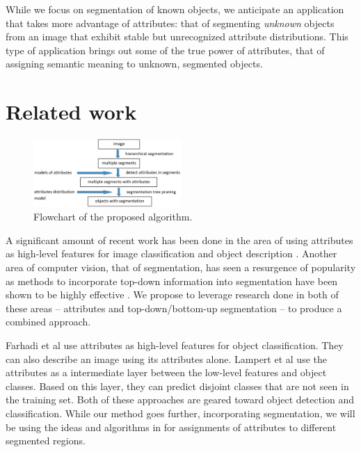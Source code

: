 \documentclass[10pt,twocolumn,letterpaper]{article}
\begin{document}
While we focus on segmentation of known objects, we anticipate an application
that takes more advantage of attributes: that of segmenting \emph{unknown}
objects from an image that exhibit stable but unrecognized attribute
distributions.  This type of application brings out some of the true power of
attributes, that of assigning semantic meaning to unknown, segmented objects.


\section{Related work}
\label{sec:related_work}

\begin{figure}
\centering
\includegraphics[width=0.5\textwidth]{figures/flowchart.eps}
\caption{Flowchart of the proposed algorithm.} \label{fig:flowchart}
\end{figure}

A significant amount of recent work has been done in the area of using
attributes as high-level features for image classification and object
description \cite{farhadi09, lampert09, kumar09}.
Another area of computer vision, that of segmentation,
has seen a resurgence of popularity as methods to incorporate top-down
information into segmentation have been shown to be highly effective
\cite{borenstein04, pantofaru, gu09, russell06, malisiewicz, leibe04, hoiem05, shotton06}.
We propose to leverage research done in both of these areas -- attributes
and top-down/bottom-up segmentation -- to produce a combined approach.

Farhadi et al
\cite{farhadi09} use attributes as high-level features for object classification. They
can also describe an image using its attributes alone.
Lampert et al \cite{lampert09}
use the attributes as a intermediate layer between the low-level
features and object classes. Based on this layer, they can predict
disjoint classes that are not seen in the training set.  Both of these
approaches are geared toward object detection and classification.  While
our method goes further, incorporating segmentation, we will be using
the ideas and algorithms in \cite{farhadi09} for assignments of
attributes to different segmented regions.
\end{document}
